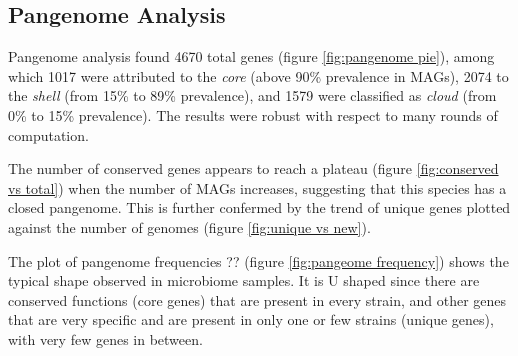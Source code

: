 \subsection*{Pangenome Analysis}
\graphicspath{{images/pangenomeAnalysis}}






Pangenome analysis found 4670 total genes (figure \ref{fig:pangenome pie}), 
among which 1017 were attributed to the \emph{core} (above 90\% prevalence in MAGs),
2074 to the \emph{shell} (from 15\% to 89\% prevalence), and 1579 were classified as \emph{cloud}
(from 0\% to 15\% prevalence). The results were robust with respect to many rounds of computation.

The number of conserved genes appears to reach a plateau (figure \ref{fig:conserved vs total})
when the number of MAGs increases, suggesting that this species has a closed pangenome.
This is further confermed by the trend of unique genes plotted against the number of
genomes (figure \ref{fig:unique vs new}).

The plot of pangenome frequencies ?? (figure \ref{fig:pangeome frequency}) shows the typical shape observed in microbiome samples.
It is U shaped since there are conserved functions (core genes) that are present in every strain, and
other genes that are very specific and are present in only one or few strains (unique genes), with very few genes in between.

